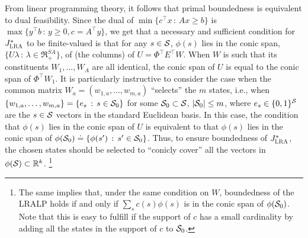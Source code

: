 \documentclass[twocolumn]{IEEEtran}
\begin{document}
From linear programming theory, it follows that primal boundedness is equivalent to dual feasibility. 
Since the dual of $\min\{c^\top x\,:\, Ax \ge b \}$ is 
$\max\{ y^\top b\,:\, y \ge 0, c = A^\top y\}$, we get
that a necessary and sufficient condition for $\Jlro$ 
to be finite-valued is that for any $s\in \S$, $\phi(s)$ lies in the conic span, 
$\{ U \lambda\,:\, \lambda\in \Re_+^{SA}\}$, of (the columns) of $U = \Phi^\top E^\top W$.
When $W$ is such that its constituents $W_1,\dots,W_A$ are all identical, 
the conic span of $U$ is equal to the conic span of $\Phi^\top W_1$. 
It is particularly instructive 
to consider the case when the common matrix $W_a = (w_{1,a},\dots,w_{m,a})$ ``selects'' the $m$ states,
i.e., when $\{w_{1,a},\dots,w_{m,a}\}= \{ e_{s}\,:\, s\in \S_0 \}$ for some $\S_0\subset \S$, $|\S_0|\le m$,
where $e_s\in \{0,1\}^\S$ are the $s\in \S$ vectors in the standard Euclidean basis.
In this case, the condition that $\phi(s)$ lies in the conic span of $U$ 
is equivalent to that $\phi(s)$ lies in the conic span of $\phi(\S_0) \doteq \{\phi(s')\,:\, s'\in \S_0\}$. 
Thus, to ensure boundedness of $\Jlro$, 
the chosen states should be selected to ``conicly cover'' all the vectors in $\phi(\S)\subset \Re^k$.%
\footnote{The same implies that, under the same condition on $W$, boundedness of the LRALP 
holds if and only if $\sum_s c(s) \phi(s)$ is in the conic span of $\phi(\S_0)$. Note that this is easy to fulfill
if the support of $c$ has a small cardinality by adding all the states in the support of $c$ to $\S_0$.
}
\end{document}
